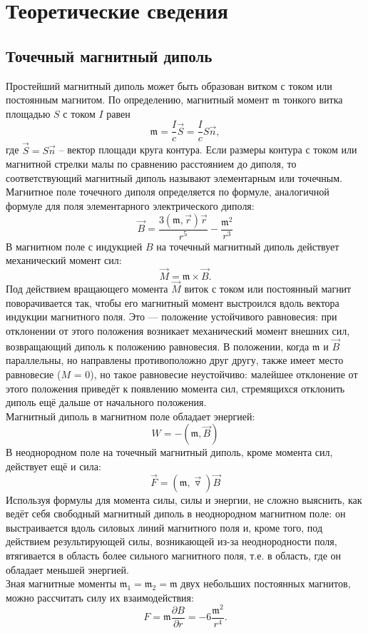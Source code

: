 \documentclass[a4paper,12pt]{article}
\begin{document}
\section{Теоретические сведения}
\subsection*{Точечный магнитный диполь}
Простейший магнитный диполь может быть образован витком с током или постоянным магнитом. По определению, магнитный момент $\mathfrak{m}$ тонкого витка площадью $S$ с током $I$ равен
$$
{\mathfrak{m}}=\dfrac{I}{c}\vec{S}=\dfrac{I}{c}S\vec{n},
$$
где $\vec{S}=S\vec{n}$ -- вектор площади круга контура. Если размеры контура с током или магнитной стрелки малы по сравнению расстоянием до диполя, то соответствующий магнитный диполь называют элементарным или точечным.\\
Магнитное поле точечного диполя определяется по формуле, аналогичной формуле для поля
элементарного электрического диполя:
$$
\vec{B}=\dfrac{3(\mathfrak{m},\vec{r})\vec{r}}{r^5} - \dfrac{\mathfrak{m}^2}{r^3}
$$ 
В магнитном поле с индукцией $B$
на точечный магнитный диполь 
действует механический
момент сил:
$$
\vec{M} = {\mathfrak{m}}\times \vec{B}.
$$
Под действием вращающего момента $\vec{M}$ виток с током или постоянный магнит поворачивается
так, чтобы его магнитный момент выстроился вдоль вектора индукции магнитного поля. Это —
положение устойчивого равновесия: при отклонении от этого положения возникает механический
момент внешних сил, возвращающий диполь к положению равновесия. В положении, когда ${\mathfrak{m}}$ и $\vec{B}$
параллельны, но направлены противоположно друг другу, также имеет место равновесие ($M$ = 0),
но такое равновесие неустойчиво: малейшее отклонение от этого положения приведёт к появлению
момента сил, стремящихся отклонить диполь ещё дальше от начального положения.\\
Магнитный диполь в магнитном поле обладает энергией:
$$
W = -({\mathfrak{m}},\vec{B})
$$
В неоднородном поле на точечный магнитный диполь, кроме момента сил, действует ещё и сила:
$$
\vec{F}=({\mathfrak{m}},\vec{\triangledown})\vec{B}
$$
Используя формулы для момента силы, силы и энергии, не сложно выяснить, как ведёт себя
свободный магнитный диполь в неоднородном магнитном поле: он выстраивается вдоль силовых
линий магнитного поля и, кроме того, под действием результирующей силы, возникающей из-за
неоднородности поля, втягивается в область более сильного магнитного поля, т.е. в область, где он
обладает меньшей энергией.\\
Зная магнитные моменты $\mathfrak{m}_1 = \mathfrak{m}_2 = \mathfrak{m}$ двух небольших постоянных магнитов, можно рассчитать силу
их взаимодействия:
$$
F = \mathfrak{m} \dfrac{\partial B}{\partial r}=-6\dfrac{\mathfrak{m}^2}{r^4}.
$$
\end{document}
